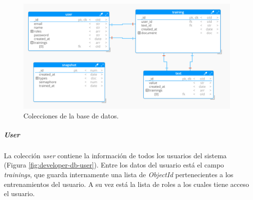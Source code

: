 \documentclass[12pt,a4paper,]{scrartcl}
\let\oldsubparagraph\subparagraph
\renewcommand{\subparagraph}[1]{\oldsubparagraph{#1}\mbox{}}
\begin{document}
\begin{figure}[H]

{\centering \includegraphics{assets/developer/db-overview.pdf} 

}

\caption{Colecciones de la base de datos.}\label{fig:developer-db-overview}
\end{figure}

\hypertarget{user}{%
\subparagraph{\texorpdfstring{\emph{User}}{User}}\label{user}}

La colección \emph{user} contiene la información de todos los usuarios del sistema (Figura \ref{fig:developer-db-user}). Entre los datos del usuario está el campo \emph{trainings}, que guarda internamente una lista de \emph{ObjectId} pertenecientes a los entrenamientos del usuario. A su vez está la lista de roles a los cuales tiene acceso el usuario.
\end{document}
